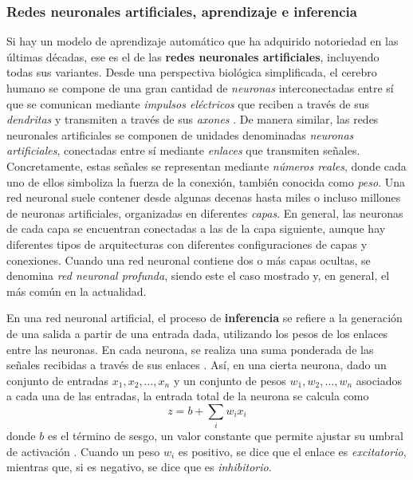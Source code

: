 \documentclass[a4paper, 11pt]{article}
\begin{document}
\subsubsection{Redes neuronales artificiales, aprendizaje e inferencia} \label{redes_neuronales}

Si hay un modelo de aprendizaje automático que ha adquirido notoriedad en las últimas décadas, ese
es el de las \textbf{redes neuronales artificiales}, incluyendo todas sus variantes. Desde una
perspectiva biológica simplificada, el cerebro humano se compone de una gran cantidad de
\textit{neuronas} interconectadas entre sí que se comunican mediante \textit{impulsos eléctricos}
que reciben a través de sus \textit{dendritas} y transmiten a través de sus \textit{axones}
\cite{article}. De manera similar, las redes neuronales artificiales se componen de unidades
denominadas \textit{neuronas artificiales}, conectadas entre sí mediante \textit{enlaces} que
transmiten señales. Concretamente, estas señales se representan mediante \textit{números reales},
donde cada uno de ellos simboliza la fuerza de la conexión, también conocida como \textit{peso}. Una
red neuronal suele contener desde algunas decenas hasta miles o incluso millones de neuronas
artificiales, organizadas en diferentes \textit{capas}. En general, las neuronas de cada capa se
encuentran conectadas a las de la capa siguiente, aunque hay diferentes tipos de arquitecturas con
diferentes configuraciones de capas y conexiones. Cuando una red neuronal contiene dos o más capas
ocultas, se denomina \textit{red neuronal profunda}, siendo este el caso mostrado y, en general, el
más común en la actualidad.

En una red neuronal artificial, el proceso de \textbf{inferencia} se refiere a la generación de una
salida a partir de una entrada dada, utilizando los pesos de los enlaces entre las neuronas. En cada
neurona, se realiza una suma ponderada de las señales recibidas a través de sus enlaces
\cite[Capítulo~6]{jurafsky2026speech}. Así, en una cierta neurona, dado un conjunto de entradas
$x_1, x_2, \dots, x_n$ y un conjunto de pesos $w_1, w_2, \dots, w_n$ asociados a cada una de las
entradas, la entrada total de la neurona se calcula como
\begin{equation}
  z = b + \sum_{i} w_i x_i \label{na_entrada_total}
\end{equation}
donde $b$ es el término de sesgo, un valor constante que permite ajustar su umbral de activación
\cite{krose1996introduction}. Cuando un peso $w_i$ es positivo, se dice que el enlace es
\textit{excitatorio}, mientras que, si es negativo, se dice que es \textit{inhibitorio}.
\end{document}
